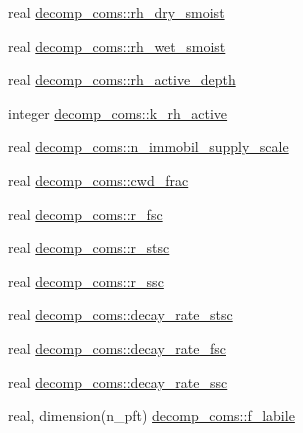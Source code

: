 \begin{DoxyCompactItemize}
real \hyperlink{namespacedecomp__coms_a376a5f59af3fff1df41ee2526e12d770}{decomp\+\_\+coms\+::rh\+\_\+dry\+\_\+smoist}
\item 
real \hyperlink{namespacedecomp__coms_a44a77512c0fb885ba9e4466402acd9c7}{decomp\+\_\+coms\+::rh\+\_\+wet\+\_\+smoist}
\item 
real \hyperlink{namespacedecomp__coms_a341e2649f9bd1e218c98505c0b7ce787}{decomp\+\_\+coms\+::rh\+\_\+active\+\_\+depth}
\item 
integer \hyperlink{namespacedecomp__coms_ad0a2f36f4bb43093696721e09df4a9e9}{decomp\+\_\+coms\+::k\+\_\+rh\+\_\+active}
\item 
real \hyperlink{namespacedecomp__coms_a75e582cc925b90448eed4ff7320fce15}{decomp\+\_\+coms\+::n\+\_\+immobil\+\_\+supply\+\_\+scale}
\item 
real \hyperlink{namespacedecomp__coms_a98eb32e300e06da7e5f6f8c75cdf1b01}{decomp\+\_\+coms\+::cwd\+\_\+frac}
\item 
real \hyperlink{namespacedecomp__coms_a0bef042050b97eeb7d14266674efd4fd}{decomp\+\_\+coms\+::r\+\_\+fsc}
\item 
real \hyperlink{namespacedecomp__coms_a632207b6b921ec9332d72826f6f92425}{decomp\+\_\+coms\+::r\+\_\+stsc}
\item 
real \hyperlink{namespacedecomp__coms_a039995e3414a2ec7fbabdb27f801425b}{decomp\+\_\+coms\+::r\+\_\+ssc}
\item 
real \hyperlink{namespacedecomp__coms_a6e61ed0b816c5e67c3163a235644aa5f}{decomp\+\_\+coms\+::decay\+\_\+rate\+\_\+stsc}
\item 
real \hyperlink{namespacedecomp__coms_afb3b626ea1538ffe9fda37c6be99fd2e}{decomp\+\_\+coms\+::decay\+\_\+rate\+\_\+fsc}
\item 
real \hyperlink{namespacedecomp__coms_a4f019556e7a13ea97a848a68f8aea865}{decomp\+\_\+coms\+::decay\+\_\+rate\+\_\+ssc}
\item 
real, dimension(n\+\_\+pft) \hyperlink{namespacedecomp__coms_a073b9f7c8ba7d2817a8b7fb32737d871}{decomp\+\_\+coms\+::f\+\_\+labile}
\end{DoxyCompactItemize}
